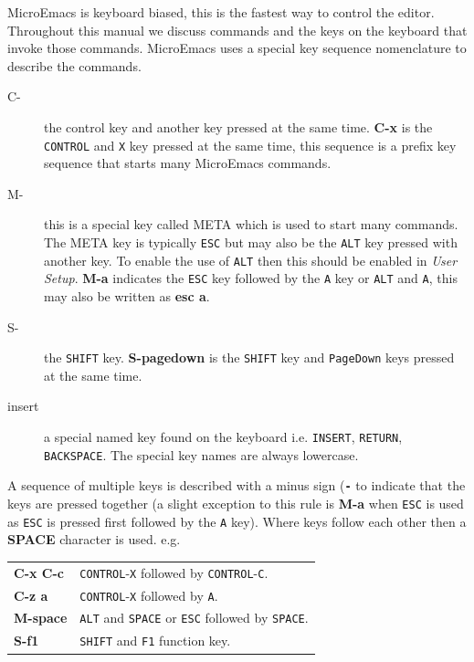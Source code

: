 \documentclass[11pt,a4paper,pdftex]{article}
\begin{document}
  MicroEmacs is keyboard biased, this is the fastest way to control the
  editor. Throughout this manual we discuss commands and the keys on the
  keyboard that invoke those commands. MicroEmacs uses a special key sequence
  nomenclature to describe the commands.

  \begin{description}

    \item[C-] the control key and another key pressed at the same time.
    \textbf{C-x} is the \texttt{CONTROL} and \texttt{X} key pressed at the
    same time, this sequence is a prefix key sequence that starts many
    MicroEmacs commands.

    \item[M-] this is a special key called META which is used to start many
    commands. The META key is typically \texttt{ESC} but may also be the
    \texttt{ALT} key pressed with another key. To enable the use of
    \texttt{ALT} then this should be enabled in \textit{User Setup}.
    \textbf{M-a} indicates the \texttt{ESC} key followed by the \texttt{A} key
    or \texttt{ALT} and \texttt{A}, this may also be written as \textbf{esc
    a}.

    \item[S-] the \texttt{SHIFT} key. \textbf{S-pagedown} is the
    \texttt{SHIFT} key and \texttt{PageDown} keys pressed at the same time.

    \item[insert] a special named key found on the keyboard i.e.
    \texttt{INSERT}, \texttt{RETURN}, \texttt{BACKSPACE}. The special key
    names are always lowercase.

  \end{description}

  A sequence of multiple keys is described with a minus sign
  (\textbf{\texttt{-}} to indicate that the keys are pressed together (a
  slight exception to this rule is \textbf{M-a} when \texttt{ESC} is used as
  \texttt{ESC} is pressed first followed by the \texttt{A} key). Where keys
  follow each other then a \textbf{SPACE} character is used. e.g.

  \begin{longtable}{l@{\ --\ }l}
    \endhead
    \endfoot
    \endlastfoot
    \textbf{C-x C-c} & \texttt{CONTROL}-\texttt{X} followed by
                       \texttt{CONTROL}-\texttt{C}.\\

    \textbf{C-z a} & \texttt{CONTROL}-\texttt{X} followed by \texttt{A}.\\
    \textbf{M-space} & \texttt{ALT} and \texttt{SPACE} or \texttt{ESC} followed
                       by \texttt{SPACE}.\\
    \textbf{S-f1} & \texttt{SHIFT} and \texttt{F1} function key.\\
  \end{longtable}
\end{document}
